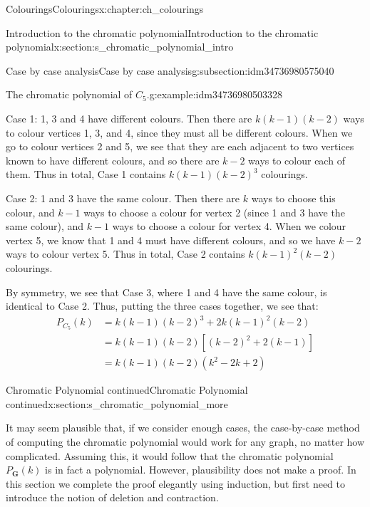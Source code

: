 \documentclass[oneside,10pt,]{book}
\numberwithin{equation}{section}
\newcommand{\bfG}{\mathbf{G}}
\newcommand{\amp}{&}
\begin{document}
\begin{chapterptx}{Colourings}{}{Colourings}{}{}{x:chapter:ch_colourings}
\begin{sectionptx}{Introduction to the chromatic polynomial}{}{Introduction to the chromatic polynomial}{}{}{x:section:s_chromatic_polynomial_intro}
\begin{subsectionptx}{Case by case analysis}{}{Case by case analysis}{}{}{g:subsection:idm34736980575040}
\begin{example}{The chromatic polynomial of \(C_5\).}{g:example:idm34736980503328}
\begin{sidebyside}{2}{0.025}{0.025}{0.05}
\begin{sbspanel}{0.3}
{
}%
\end{sbspanel}%
\end{sidebyside}%
Case 1: 1, 3 and 4 have different colours.  Then there are \(k(k-1)(k-2)\) ways to colour vertices 1, 3, and 4, since they must all be different colours.  When we go to colour vertices 2 and 5, we see that they are each adjacent to two vertices known to have different colours, and so there are \(k-2\) ways to colour each of them.  Thus in total, Case 1 contains \(k(k-1)(k-2)^3\) colourings.%
\par
Case 2: 1 and 3 have the same colour. Then there are \(k\) ways to choose this colour, and \(k-1\) ways to choose a colour for vertex 2 (since 1 and 3 have the same colour), and \(k-1\) ways to choose a colour for vertex 4.  When we colour vertex 5, we know that 1 and 4 must have different colours, and so we have \(k-2\) ways to colour vertex 5.  Thus in total, Case 2 contains \(k(k-1)^2(k-2)\) colourings.%
\par
By symmetry, we see that Case 3, where 1 and 4 have the same colour, is identical to Case 2.  Thus, putting the three cases together, we see that:%
%
\begin{align*}
P_{C_5}(k)\amp=k(k-1)(k-2)^3+2k(k-1)^2(k-2)\\
\amp=k(k-1)(k-2)[(k-2)^2+2(k-1)]\\
\amp=k(k-1)(k-2)(k^2-2k+2)
\end{align*}
\end{example}
\end{subsectionptx}
\end{sectionptx}
%
%
\typeout{************************************************}
\typeout{************************************************}
%
\begin{sectionptx}{Chromatic Polynomial continued}{}{Chromatic Polynomial continued}{}{}{x:section:s_chromatic_polynomial_more}
\begin{introduction}{}%
It may seem plausible that, if we consider enough cases, the case-by-case method of computing the chromatic polynomial would work for any graph, no matter how complicated.  Assuming this, it would follow that the chromatic polynomial \(P_\bfG(k)\) is in fact a polynomial.  However, plausibility does not make a proof.  In this section we complete the proof elegantly using induction, but first need to introduce the notion of deletion and contraction.%

\end{introduction}
\end{sectionptx}
\end{chapterptx}
\end{document}
